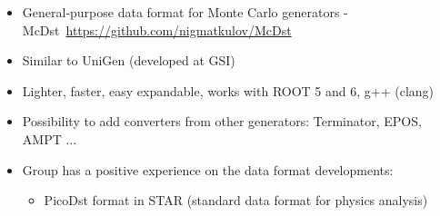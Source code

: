 \documentclass[dvipsnames] {beamer}
\begin{document}
\begin{frame}
\begin{columns}[t]
          \begin{block}{\bf {}}
            \begin{itemize}
            \item  \footnotesize General-purpose data format for Monte Carlo generators - McDst~\url{https://github.com/nigmatkulov/McDst}
            \item  \footnotesize Similar to UniGen (developed at GSI)
            \item  \footnotesize Lighter, faster, easy expandable, works with ROOT 5 and 6, g++ (clang)
            \item  \footnotesize Possibility to add converters from other generators: Terminator, EPOS, AMPT ...
            \item  \footnotesize Group has a positive experience on the data format developments:
              \begin{itemize}
              \item  \footnotesize PicoDst format in STAR (standard data format for physics analysis)
              \end{itemize}
            \end{itemize}
          \end{block}
        \end{columns}
      \end{frame}
\end{document}
